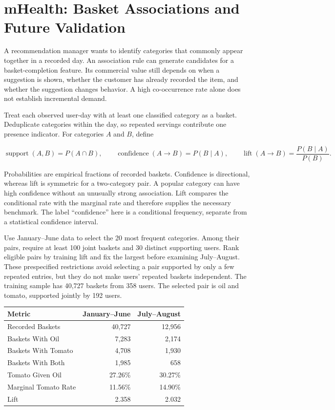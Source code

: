 \hypertarget{M07-mhealth-basket-associations-and-future-validation}{%
\section{mHealth: Basket Associations and Future
Validation}\label{M07-mhealth-basket-associations-and-future-validation}}

\noindent A recommendation manager wants to identify categories that commonly
appear together in a recorded day. An association rule can generate
candidates for a basket-completion feature. Its commercial value still
depends on when a suggestion is shown, whether the customer has already
recorded the item, and whether the suggestion changes behavior. A high
co-occurrence rate alone does not establish incremental demand.

Treat each observed user-day with at least one classified category as a
basket. Deduplicate categories within the day, so repeated servings
contribute one presence indicator. For categories \(A\) and \(B\),
define

\[
\operatorname{support}(A,B)=P(A\cap B),\qquad
\operatorname{confidence}(A\to B)=P(B\mid A),\qquad
\operatorname{lift}(A\to B)=\frac{P(B\mid A)}{P(B)}.
\]

Probabilities are empirical fractions of recorded baskets. Confidence is
directional, whereas lift is symmetric for a two-category pair. A
popular category can have high confidence without an unusually strong
association. Lift compares the conditional rate with the marginal rate
and therefore supplies the necessary benchmark. The label ``confidence''
here is a conditional frequency, separate from a statistical confidence
interval.

Use January--June data to select the 20 most frequent categories. Among
their pairs, require at least 100 joint baskets and 30 distinct
supporting users. Rank eligible pairs by training lift and fix the
largest before examining July--August. These prespecified restrictions
avoid selecting a pair supported by only a few repeated entries, but
they do not make users' repeated baskets independent. The training
sample has 40,727 baskets from 358 users. The selected pair is oil and
tomato, supported jointly by 192 users.

\begin{table}[H]
\centering\small
\begin{tabular}{@{}lrr@{}}
\toprule
Metric & January--June & July--August \\
\midrule

Recorded Baskets & 40,727 & 12,956 \\
Baskets With Oil & 7,283 & 2,174 \\
Baskets With Tomato & 4,708 & 1,930 \\
Baskets With Both & 1,985 & 658 \\
Tomato Given Oil & 27.26\% & 30.27\% \\
Marginal Tomato Rate & 11.56\% & 14.90\% \\
Lift & 2.358 & 2.032 \\
\bottomrule
\end{tabular}
\end{table}

